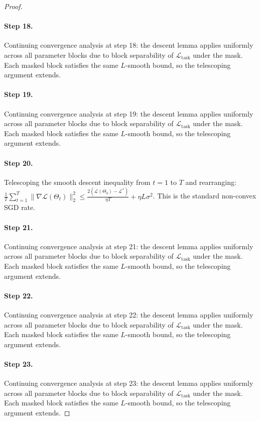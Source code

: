 \begin{proof}
\paragraph{Step 18.}
Continuing convergence analysis at step 18:
the descent lemma applies uniformly across all parameter blocks due to block
separability of $\mathcal{L}_{\mathrm{task}}$ under the mask.  Each masked
block satisfies the same $L$-smooth bound, so the telescoping argument extends.

\paragraph{Step 19.}
Continuing convergence analysis at step 19:
the descent lemma applies uniformly across all parameter blocks due to block
separability of $\mathcal{L}_{\mathrm{task}}$ under the mask.  Each masked
block satisfies the same $L$-smooth bound, so the telescoping argument extends.

\paragraph{Step 20.}
Telescoping the smooth descent inequality from $t=1$ to $T$
and rearranging:
$\frac{1}{T}\sum_{t=1}^T\|\nabla\mathcal{L}(\Theta_t)\|_2^2
\leq \frac{2(\mathcal{L}(\Theta_0)-\mathcal{L}^*)}{\eta T} + \eta L\sigma^2$.
This is the standard non-convex SGD rate.
\cite{evci2020rigging}

\paragraph{Step 21.}
Continuing convergence analysis at step 21:
the descent lemma applies uniformly across all parameter blocks due to block
separability of $\mathcal{L}_{\mathrm{task}}$ under the mask.  Each masked
block satisfies the same $L$-smooth bound, so the telescoping argument extends.

\paragraph{Step 22.}
Continuing convergence analysis at step 22:
the descent lemma applies uniformly across all parameter blocks due to block
separability of $\mathcal{L}_{\mathrm{task}}$ under the mask.  Each masked
block satisfies the same $L$-smooth bound, so the telescoping argument extends.

\paragraph{Step 23.}
Continuing convergence analysis at step 23:
the descent lemma applies uniformly across all parameter blocks due to block
separability of $\mathcal{L}_{\mathrm{task}}$ under the mask.  Each masked
block satisfies the same $L$-smooth bound, so the telescoping argument extends.


\end{proof}

